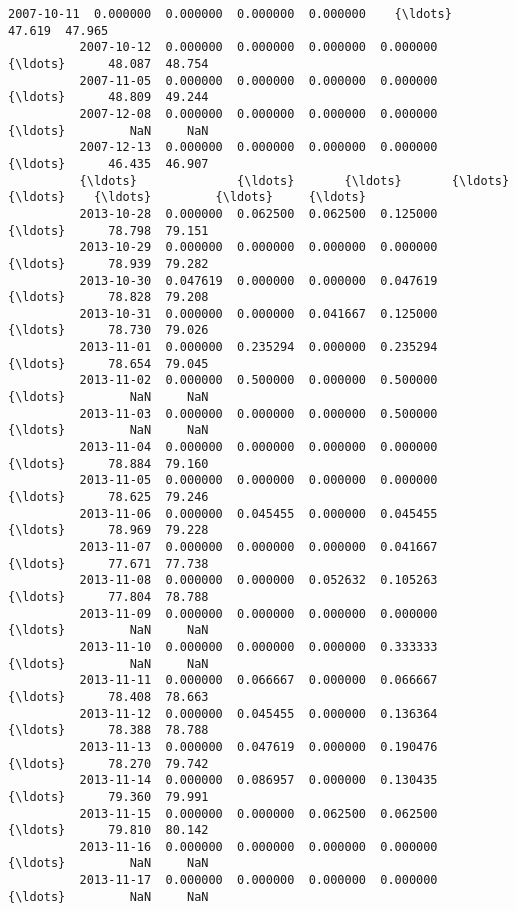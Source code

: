 \documentclass[11pt]{article}
\begin{document}
\begin{Verbatim}[commandchars=\\\{\}]
          2007-10-11  0.000000  0.000000  0.000000  0.000000    {\ldots}      47.619  47.965   
          2007-10-12  0.000000  0.000000  0.000000  0.000000    {\ldots}      48.087  48.754   
          2007-11-05  0.000000  0.000000  0.000000  0.000000    {\ldots}      48.809  49.244   
          2007-12-08  0.000000  0.000000  0.000000  0.000000    {\ldots}         NaN     NaN   
          2007-12-13  0.000000  0.000000  0.000000  0.000000    {\ldots}      46.435  46.907   
          {\ldots}              {\ldots}       {\ldots}       {\ldots}       {\ldots}    {\ldots}         {\ldots}     {\ldots}   
          2013-10-28  0.000000  0.062500  0.062500  0.125000    {\ldots}      78.798  79.151   
          2013-10-29  0.000000  0.000000  0.000000  0.000000    {\ldots}      78.939  79.282   
          2013-10-30  0.047619  0.000000  0.000000  0.047619    {\ldots}      78.828  79.208   
          2013-10-31  0.000000  0.000000  0.041667  0.125000    {\ldots}      78.730  79.026   
          2013-11-01  0.000000  0.235294  0.000000  0.235294    {\ldots}      78.654  79.045   
          2013-11-02  0.000000  0.500000  0.000000  0.500000    {\ldots}         NaN     NaN   
          2013-11-03  0.000000  0.000000  0.000000  0.500000    {\ldots}         NaN     NaN   
          2013-11-04  0.000000  0.000000  0.000000  0.000000    {\ldots}      78.884  79.160   
          2013-11-05  0.000000  0.000000  0.000000  0.000000    {\ldots}      78.625  79.246   
          2013-11-06  0.000000  0.045455  0.000000  0.045455    {\ldots}      78.969  79.228   
          2013-11-07  0.000000  0.000000  0.000000  0.041667    {\ldots}      77.671  77.738   
          2013-11-08  0.000000  0.000000  0.052632  0.105263    {\ldots}      77.804  78.788   
          2013-11-09  0.000000  0.000000  0.000000  0.000000    {\ldots}         NaN     NaN   
          2013-11-10  0.000000  0.000000  0.000000  0.333333    {\ldots}         NaN     NaN   
          2013-11-11  0.000000  0.066667  0.000000  0.066667    {\ldots}      78.408  78.663   
          2013-11-12  0.000000  0.045455  0.000000  0.136364    {\ldots}      78.388  78.788   
          2013-11-13  0.000000  0.047619  0.000000  0.190476    {\ldots}      78.270  79.742   
          2013-11-14  0.000000  0.086957  0.000000  0.130435    {\ldots}      79.360  79.991   
          2013-11-15  0.000000  0.000000  0.062500  0.062500    {\ldots}      79.810  80.142   
          2013-11-16  0.000000  0.000000  0.000000  0.000000    {\ldots}         NaN     NaN   
          2013-11-17  0.000000  0.000000  0.000000  0.000000    {\ldots}         NaN     NaN   

\end{Verbatim}
\end{document}
